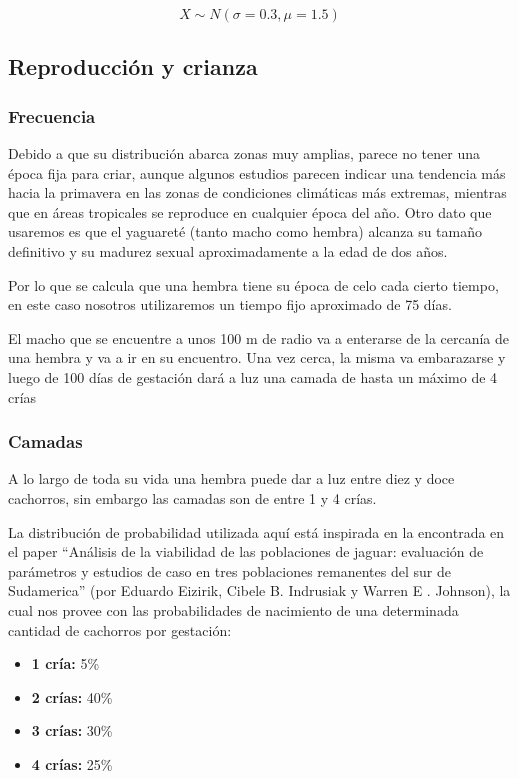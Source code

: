 \documentclass{article}
\begin{document}
    \begin{equation}
        X \sim N(\sigma=0.3, \mu=1.5)
    \end{equation}
    
    \subsection{Reproducción y crianza}
    
        \subsubsection{Frecuencia}
            Debido a que su distribución abarca zonas muy amplias, parece no tener una época fija para criar, aunque algunos estudios parecen indicar una tendencia más hacia la primavera en las zonas de condiciones climáticas más extremas, mientras que en áreas tropicales se reproduce en cualquier época del año. Otro dato que usaremos es que el yaguareté (tanto macho como hembra) alcanza su tamaño definitivo y su madurez sexual aproximadamente a la edad de dos años.
            
            Por lo que se calcula que una hembra tiene su época de celo cada cierto tiempo, en este caso nosotros utilizaremos un tiempo fijo aproximado de 75 días.
            
            El macho que se encuentre a unos 100 m de radio va a enterarse de la cercanía de una hembra y va a ir en su encuentro. Una vez cerca, la misma va embarazarse y luego de 100 días de gestación dará a luz una camada de hasta un máximo de 4 crías
        
        \subsubsection{Camadas}
            A lo largo de toda su vida una hembra puede dar a luz entre diez y doce cachorros, sin embargo las camadas son de entre 1 y 4 crías.
            
            La distribución de probabilidad utilizada aquí está inspirada en la encontrada en el paper “Análisis de la viabilidad de las poblaciones de jaguar: evaluación de parámetros y estudios de caso en tres poblaciones remanentes del sur de Sudamerica” (por Eduardo Eizirik, Cibele B. Indrusiak y Warren E . Johnson), la cual nos provee con las probabilidades de nacimiento de una determinada cantidad de cachorros por gestación:

            \begin{itemize}
                \item \textbf{1 cría:} 5\%
                \item \textbf{2 crías:} 40\%
                \item \textbf{3 crías:} 30\%
                \item \textbf{4 crías:} 25\%
            \end{itemize}
\end{document}
